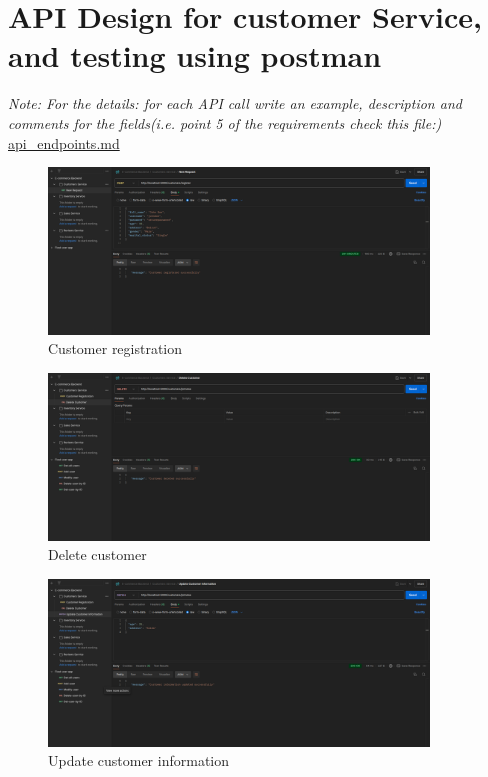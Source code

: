 \documentclass{article}
\begin{document}
\section{API Design for customer Service, and testing using postman}
\textit{Note: For the details: for each API call write an example, description and comments for the fields(i.e. point 5 of the requirements check this file:)} \underline{api\_endpoints.md}
\begin{figure}[H]
\centering
\includegraphics[width=0.9\textwidth]{images/3.png}
\caption{Customer registration}
\end{figure}
\begin{figure}[H]
\centering
\includegraphics[width=0.9\textwidth]{images/4.png}
\caption{Delete customer}
\end{figure}
\begin{figure}[H]
\centering
\includegraphics[width=0.9\textwidth]{images/5.png}
\caption{Update customer information}
\end{figure}
\end{document}
